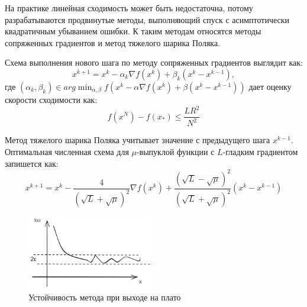На практике линейная сходимость может быть недостаточна, потому разрабатываются продвинутые методы, выполняющий спуск с
асимптотически квадратичным убыванием ошибки. К таким методам относятся методы сопряженных градиентов и 
метод тяжелого шарика Поляка.

Схема выполнения нового шага по методу сопряженных градиентов выглядит как:
\begin{equation}
    x^{k+1} = x^k - \alpha_k \nabla f(x^k) + \beta_k (x^k -x^{k-1}),
\end{equation}
где $(\alpha_k,\beta_k) \in arg \min_{\alpha,\beta} f(x^k - \alpha \nabla f(x^k) + \beta (x^k -x^{k-1}))$
дает оценку скорости сходимости как:
\begin{equation}
    f(x^N) -f(x_*) \le \frac{L R^2}{N^2}
\end{equation}

Метод тяжелого шарика Поляка учитывает значение с предыдущего шага $x^{k-1}$. Оптимальная численная схема
для $\mu$-выпуклой функции с $L$-гладким градиентом запишется как:
\begin{equation}
    x^{k+1} = x^k - \frac{4}{(\sqrt{L}+ \sqrt{\mu})^2} \nabla f(x^k) + \frac{(\sqrt{L} -\sqrt{\mu})^2}{(\sqrt{L} +\sqrt{\mu})^2} (x^k - x^{k-1})
\end{equation}

\begin{figure}[h]
    \centering
    \includegraphics[width=0.5\textwidth]{assets/math/optimization/stability.excalidraw.png}
    \caption{Устойчивость метода при выходе на плато}
    \label{optimization}
\end{figure}

